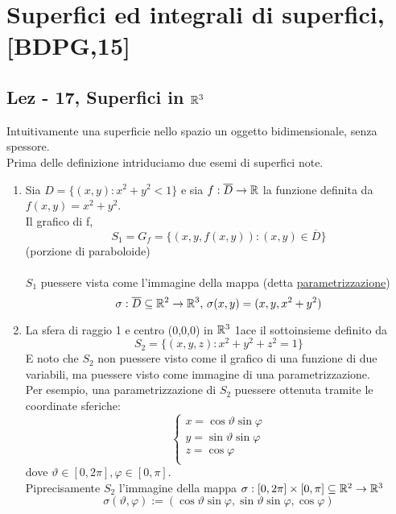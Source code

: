 \chapter{Superfici ed integrali di superfici, [BDPG,15]}
\section{Lez - 17, Superfici in $\mathbb{R}^3$}
Intuitivamente una superficie nello spazio \ace un oggetto bidimensionale, senza spessore. \\
Prima delle definizione intriduciamo due esemi di superfici note. 
\begin{example}
  \begin{enumerate}
    \item Sia $D=\{(x,y): x^2+y^2 < 1\}$ e sia $f : \overline{D} \to \mathbb{R}$ la funzione 
          definita da $f(x,y) = x^2+y^2$. \\
          Il grafico di f, 
          $$S_1 = G_f = \{(x,y,f(x,y)): (x,y)\in\overline{D}\}$$
          (porzione di paraboloide) \\\\
          $S_1$ pu\aco essere vista come l'immagine della mappa (detta \underline{parametrizzazione})
          $$\sigma : \overline{D} \subseteq \mathbb{R}^2\to\mathbb{R}^3 , \, \sigma(x,y) = (x,y,x^2+y^2)$$
    \item La sfera di raggio 1 e centro (0,0,0) in $\mathbb{R}^3$ 1ace il sottoinsieme definito da 
          $$S_2 = \{(x,y,z): x^2+y^2+z^2=1\}$$
          \ac{E} noto che $S_2$ non pu\aco essere visto come il grafico di una funzione di due 
          variabili, ma pu\aco essere visto come immagine di una parametrizzazione. \\
          Per esempio, una parametrizzazione di $S_2$ pu\aco essere ottenuta tramite le 
          coordinate sferiche:
          $$\left\{\begin{array}{l}
            x = \cos\vartheta\sin\varphi \\
            y = \sin\vartheta\sin\varphi \\
            z = \cos\varphi \\
          \end{array}\right.$$
          dove $\vartheta \in [0,2\pi], \varphi \in [0,\pi]$. \\
          Pi\acu precisamente $S_2$ \ace l'immagine della mappa 
          $\sigma : [0,2\pi]\times[0,\pi] \subseteq \mathbb{R}^2 \to \mathbb{R}^3$
          $$\sigma(\vartheta,\varphi) := (\cos\vartheta\sin\varphi, \sin\vartheta\sin\varphi, \cos\varphi)$$
  \end{enumerate} 
\end{example}
